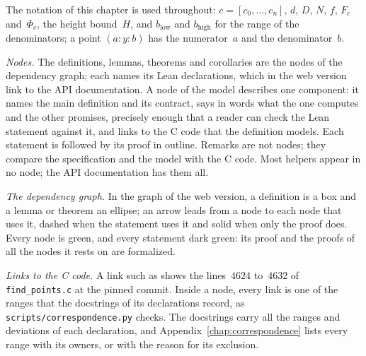 The notation of this chapter is used throughout: $c = [c_0, \dots, c_n]$, $d$, $D$, $N$, $f$,
$F_c$ and~$\Phi_c$, the height bound~$H$, and $b_{\mathrm{low}}$ and $b_{\mathrm{high}}$ for the
range of the denominators; a point $(a : y : b)$ has the numerator~$a$ and the denominator~$b$.

\emph{Nodes.} The definitions, lemmas, theorems and corollaries are the nodes of the dependency
graph; each names its Lean declarations, which in the web version link to the API documentation. A
node of the model describes one component: it names the main definition and its contract, says in
words what the one computes and the other promises, precisely enough that a reader can check the
Lean statement against it, and links to the C code that the definition models. Each statement is
followed by its proof in outline. Remarks are not nodes; they compare the specification and the
model with the C code. Most helpers appear in no node; the API documentation has them all.

\emph{The dependency graph.} In the graph of the web version, a definition is a box and a lemma or
theorem an ellipse; an arrow leads from a node to each node that uses it, dashed when the statement
uses it and solid when only the proof does. Every node is green, and every statement dark green: its
proof and the proofs of all the nodes it rests on are formalized.

\emph{Links to the C code.} A link such as  shows the
lines~$4624$ to~$4632$ of \verb|find_points.c| at the pinned commit. Inside a node, every link is
one of the ranges that the docstrings of its declarations record, as
\verb|scripts/correspondence.py| checks. The docstrings carry all the ranges and deviations of each
declaration, and Appendix~\ref{chap:correspondence} lists every range with its owners, or with the
reason for its exclusion.

